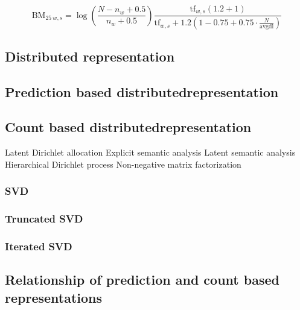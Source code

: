         $$\mathrm{BM}_{25~w,s} = \log \left(\frac{N-n_w+0.5}{n_w + 0.5}\right)    \frac{\mathrm{tf}_{w,s} (1.2 + 1)}{\mathrm{tf}_{w,s} + 1.2  \left(1 - 0.75 + 0.75 \cdot \frac{N}{\text{avgdl}}\right)}$$
        

        \subsection{Distributed representation}
        \cite{le2014distributed}


        \subsection{Prediction based distributedrepresentation}
        \cite{Rubenstein:1965:CCS:365628.365657} %
        
        \cite{maas2011learning} %

        \cite{DBLP:journals/corr/MikolovSCCD13} %
        \cite{DBLP:conf/icml/LeM14} %
        \cite{rong2014word2vec} %
        \cite{pennington2014glove} %


        \subsection{Count based distributedrepresentation}
        \cite{wiemer2004latent} %
        \cite{landauer1998introduction} %
        Latent Dirichlet allocation
        Explicit semantic analysis
        Latent semantic analysis
        Hierarchical Dirichlet process
        Non-negative matrix factorization
        \subsubsection{SVD}
        {}
        \subsubsection{Truncated SVD}
        \subsubsection{Iterated SVD}
            \cite{brand2006fast} %

        
        \subsection{Relationship of prediction and count based representations}
            \cite{naili2017comparative} %
            \cite{levy2014neural} %
            \cite{altszyler2016comparative} %
            \cite{levy2015improving} %
    
